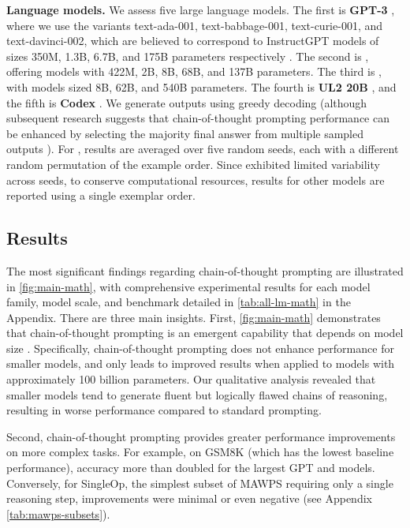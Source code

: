 \textbf{Language models.} We assess five large language models. The first is \textbf{GPT-3} \citep{brown2020language}, where we use the variants text-ada-001, text-babbage-001, text-curie-001, and text-davinci-002, which are believed to correspond to InstructGPT models of sizes 350M, 1.3B, 6.7B, and 175B parameters respectively \citep{ouyang2022training}. The second is \textbf{\lamda{}} \citep{thoppilan2022lamda}, offering models with 422M, 2B, 8B, 68B, and 137B parameters. The third is \textbf{\palm{}}, with models sized 8B, 62B, and 540B parameters. The fourth is \textbf{UL2 20B} \citep{tay2022unifying}, and the fifth is \textbf{Codex} \citep[][code-davinci-002 in the OpenAI API]{chen2021evaluating}. We generate outputs using greedy decoding (although subsequent research suggests that chain-of-thought prompting performance can be enhanced by selecting the majority final answer from multiple sampled outputs \citep{wang2022self}). For \lamda{}, results are averaged over five random seeds, each with a different random permutation of the example order. Since \lamda{} exhibited limited variability across seeds, to conserve computational resources, results for other models are reported using a single exemplar order.

\subsection{Results}
The most significant findings regarding chain-of-thought prompting are illustrated in \cref{fig:main-math}, with comprehensive experimental results for each model family, model scale, and benchmark detailed in \cref{tab:all-lm-math} in the Appendix. There are three main insights. First, \cref{fig:main-math} demonstrates that chain-of-thought prompting is an emergent capability that depends on model size \citep{wei2022emergent}. Specifically, chain-of-thought prompting does not enhance performance for smaller models, and only leads to improved results when applied to models with approximately 100 billion parameters. Our qualitative analysis revealed that smaller models tend to generate fluent but logically flawed chains of reasoning, resulting in worse performance compared to standard prompting.


Second, chain-of-thought prompting provides greater performance improvements on more complex tasks. For example, on GSM8K (which has the lowest baseline performance), accuracy more than doubled for the largest GPT and \palm{} models. Conversely, for SingleOp, the simplest subset of MAWPS requiring only a single reasoning step, improvements were minimal or even negative (see Appendix \cref{tab:mawps-subsets}).

